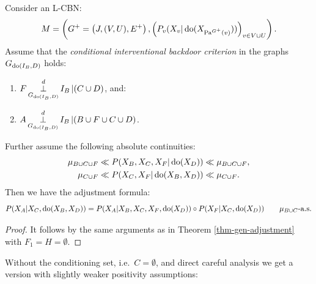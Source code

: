 \begin{Cor}
    \label{cor:backdoor-cond-int}
    Consider an L-CBN:
        \[M= \left ( G^+=\left ( J,(V,U),E^+ \right ), \left ( P_v ( X_v|\operatorname{do}( X_{\mathrm{Pa}^{G^+}(v)})) \right )_{v \in V \cup U} \right ).\]
  Assume that the \emph{conditional interventional backdoor criterion} in the graphs $G_{\operatorname{do}(I_B,D)}$ holds:
\begin{enumerate}
    \item $\displaystyle F \operatorname*{\perp}^d_{G_{\operatorname{do}(I_B,D)}} I_B  \operatorname*{|} (C \cup D)$, and:
    \item $\displaystyle A \operatorname*{\perp}^d_{G_{\operatorname{do}(I_B,D)}} I_B  \operatorname*{|} (B \cup F \cup C \cup D)$.
\end{enumerate}
    Further assume the following absolute continuities:
  \begin{align*}
      \mu_{B \cup C \cup F} &\ll  P(X_B,X_C,X_F|\operatorname{do}(X_D)) \ll \mu_{B \cup C \cup F},\\
      \mu_{C \cup F} &\ll  P(X_C,X_F|\operatorname{do}(X_B,X_D)) \ll \mu_{C \cup F}.
  \end{align*}
Then we have the adjustment formula: 
\[ P(X_A|X_C,\operatorname{do}(X_B,X_D)) = P(X_A|X_B,X_C,X_F,\operatorname{do}(X_D)) \circ P(X_F|X_C,\operatorname{do}(X_D)) \qquad \mu_{B \cup C}\text{-a.s.} \]
\begin{proof}
    It follows by the same arguments as in Theorem \ref{thm-gen-adjustment} with $F_1=H=\emptyset$.
\end{proof}
\end{Cor}

Without the conditioning set, i.e.\ $C=\emptyset$, and direct careful analysis we get a version with slightly weaker positivity assumptions:

